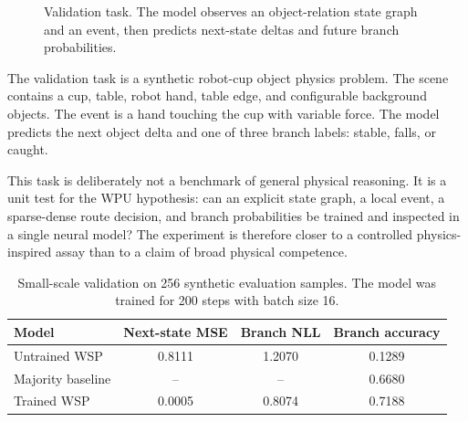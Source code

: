 \documentclass[11pt]{article}
\newcommand{\state}{\mathcal{S}}
\begin{document}
\begin{figure}[t]
\centering
{}
\caption{Validation task. The model observes an object-relation state graph and
an event, then predicts next-state deltas and future branch probabilities.}
\label{fig:validation}
\end{figure}

The validation task is a synthetic robot-cup object physics problem. The scene
contains a cup, table, robot hand, table edge, and configurable background
objects. The event is a hand touching the cup with variable force. The model
predicts the next object delta and one of three branch labels: stable, falls, or
caught.

This task is deliberately not a benchmark of general physical reasoning. It is
a unit test for the WPU hypothesis: can an explicit state graph, a local event,
a sparse-dense route decision, and branch probabilities be trained and inspected
in a single neural model? The experiment is therefore closer to a controlled
physics-inspired assay than to a claim of broad physical competence.

\begin{table}[t]
\centering
\begin{tabular}{lccc}
\toprule
Model & Next-state MSE & Branch NLL & Branch accuracy \\
\midrule
Untrained WSP & 0.8111 & 1.2070 & 0.1289 \\
Majority baseline & -- & -- & 0.6680 \\
Trained WSP & 0.0005 & 0.8074 & 0.7188 \\
\bottomrule
\end{tabular}
\caption{Small-scale validation on 256 synthetic evaluation samples. The model
was trained for 200 steps with batch size 16.}
\label{tab:results}
\end{table}
\end{document}
